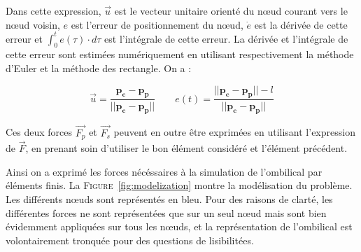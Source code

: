 \begin{description}
\begin{itemize}
						Dans cette expression, $\overrightarrow{u}$ est le vecteur unitaire orienté du n\oe ud courant vers le n\oe ud voisin, $e$ est l'erreur de positionnement du n\oe ud, $\dot e$ est la dérivée de cette erreur et $\int_{0}^te(\tau) \cdot d\tau$ est l'intégrale de cette erreur. La dérivée et l'intégrale de cette erreur sont estimées numériquement en utilisant respectivement la méthode d'Euler et la méthode des rectangle. On a :
						
						$$\overrightarrow{u} = \frac{\mathbf{p_c} - \mathbf{p_p}}{||\mathbf{p_c} - \mathbf{p_p}||} \qquad e(t) = \frac{||\mathbf{p_c} - \mathbf{p_p}|| - l}{||\mathbf{p_c} - \mathbf{p_p}||}$$
						
						Ces deux forces $\overrightarrow{F_p}$ et $\overrightarrow{F_s}$ peuvent en outre être exprimées en utilisant l'expression de $\overrightarrow{F}$, en prenant soin d'utiliser le bon élément considéré et l'élément précédent.
					\end{itemize}
				\end{description}
			
				Ainsi on a exprimé les forces nécéssaires à la simulation de l'ombilical par éléments finis. La \textsc{Figure}~\ref{fig:modelization} montre la modélisation du problème. Les différents n\oe uds sont représentés en bleu. Pour des raisons de clarté, les différentes forces ne sont représentées que sur un seul n\oe ud mais sont bien évidemment appliquées sur tous les n\oe uds, et la représentation de l'ombilical est volontairement tronquée pour des questions de lisibilitées.
			
